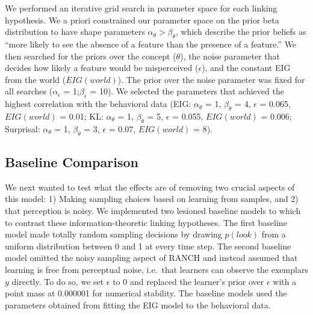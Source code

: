 \documentclass[10pt, letterpaper]{article}
\begin{document}
We performed an iterative grid search in parameter space for each
linking hypothesis. We a priori constrained our parameter space on the
prior beta distribution to have shape parameters
\(\alpha_{\theta} > \beta_{\theta}\), which describe the prior beliefs
as ``more likely to see the absence of a feature than the presence of a
feature.'' We then searched for the priors over the concept
(\(\theta\)), the noise parameter that decides how likely a feature
would be misperceived (\(\epsilon\)), and the constant EIG from the
world (\(EIG(world)\)). The prior over the noise parameter was fixed for
all searches (\(\alpha_{\epsilon}\) = 1;\(\beta_{\epsilon}\) = 10). We
selected the parameters that achieved the highest correlation with the
behavioral data (EIG: \(\alpha_{\theta}\) = 1, \(\beta_{\theta}\) = 4,
\(\epsilon\) = 0.065, \(EIG(world)\) = 0.01; KL: \(\alpha_{\theta}\) =
1, \(\beta_{\theta}\) = 5, \(\epsilon\) = 0.055, \(EIG(world)\) = 0.006;
Surprisal: \(\alpha_{\theta}\) = 1, \(\beta_{\theta}\) = 3, \(\epsilon\)
= 0.07, \(EIG(world)\) = 8).

\hypertarget{baseline-comparison}{%
\subsection{Baseline Comparison}\label{baseline-comparison}}

We next wanted to test what the effects are of removing two crucial
aspects of this model: 1) Making sampling choices based on learning from
samples, and 2) that perception is noisy. We implemented two lesioned
baseline models to which to contrast these information-theoretic linking
hypotheses. The first baseline model made totally random sampling
decisions by drawing \(p(look)\) from a uniform distribution between 0
and 1 at every time step. The second baseline model omitted the noisy
sampling aspect of RANCH and instead assumed that learning is free from
perceptual noise, i.e.~that learners can observe the exemplars \(y\)
directly. To do so, we set \(\epsilon\) to 0 and replaced the learner's
prior over \(\epsilon\) with a point mass at 0.000001 for numerical
stability. The baseline models used the parameters obtained from fitting
the EIG model to the behavioral data.
\end{document}
